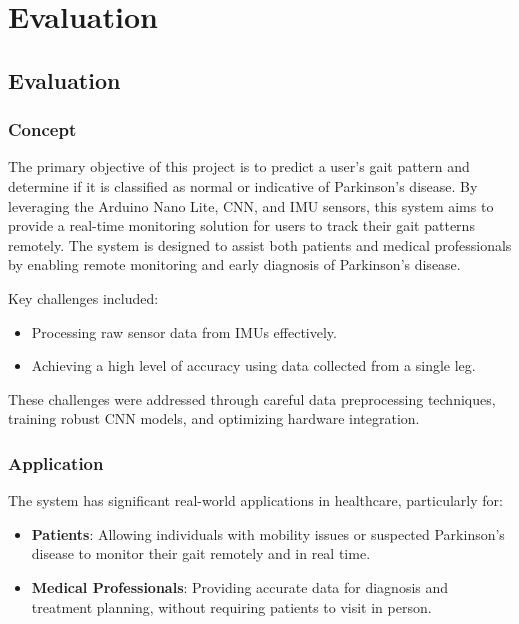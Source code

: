 %
%
%
%
\chapter{Evaluation}

\section{Evaluation}

\subsection{Concept}
The primary objective of this project is to predict a user’s gait pattern and determine if it is classified as normal or indicative of Parkinson’s disease. By leveraging the Arduino Nano Lite, CNN, and IMU sensors, this system aims to provide a real-time monitoring solution for users to track their gait patterns remotely. The system is designed to assist both patients and medical professionals by enabling remote monitoring and early diagnosis of Parkinson’s disease.

Key challenges included:
\begin{itemize}
	\item Processing raw sensor data from IMUs effectively.
	\item Achieving a high level of accuracy using data collected from a single leg.
\end{itemize}

These challenges were addressed through careful data preprocessing techniques, training robust CNN models, and optimizing hardware integration.

\subsection{Application}
The system has significant real-world applications in healthcare, particularly for:
\begin{itemize}
	\item \textbf{Patients}: Allowing individuals with mobility issues or suspected Parkinson’s disease to monitor their gait remotely and in real time.
	\item \textbf{Medical Professionals}: Providing accurate data for diagnosis and treatment planning, without requiring patients to visit in person.
\end{itemize}

